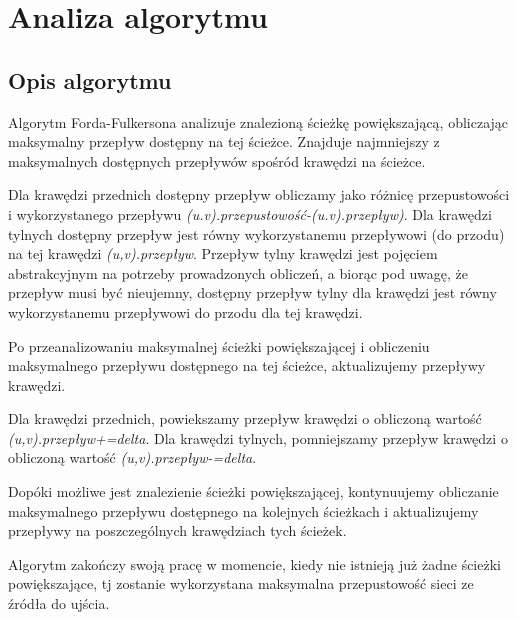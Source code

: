 \documentclass[10pt]{dokument-tiwo}
\begin{document}
\MakeDokumentMeta


\section{Analiza algorytmu}

\subsection{Opis algorytmu}
Algorytm Forda-Fulkersona analizuje znalezioną ścieżkę powiększającą, obliczając
maksymalny przepływ dostępny na tej ścieżce. Znajduje najmniejszy z maksymalnych
dostępnych przepływów spośród krawędzi na ścieżce.

Dla krawędzi przednich dostępny przepływ obliczamy jako różnicę przepustowości i
wykorzystanego przepływu \emph{(u.v).przepustowość-(u.v).przepływ)}. Dla
krawędzi tylnych dostępny przepływ jest równy wykorzystanemu przepływowi (do
przodu) na tej krawędzi \emph{(u,v).przepływ}. Przepływ tylny krawędzi jest
pojęciem abstrakcyjnym na potrzeby prowadzonych obliczeń, a biorąc pod uwagę, że
przepływ musi być nieujemny, dostępny przepływ tylny dla krawędzi jest równy
wykorzystanemu przepływowi do przodu dla tej krawędzi.

Po przeanalizowaniu maksymalnej ścieżki powiększającej i obliczeniu maksymalnego
przepływu dostępnego na tej ścieżce, aktualizujemy przepływy krawędzi.

Dla krawędzi przednich, powiekszamy przepływ krawędzi o obliczoną wartość
\emph{(u,v).przepływ+=delta}. Dla krawędzi tylnych, pomniejszamy przepływ
krawędzi o obliczoną wartość \emph{(u,v).przepływ-=delta}.

Dopóki możliwe jest znalezienie ścieżki powiększającej, kontynuujemy obliczanie
maksymalnego przepływu dostępnego na kolejnych ścieżkach i aktualizujemy
przepływy na poszczególnych krawędziach tych ścieżek.

Algorytm zakończy swoją pracę w momencie, kiedy nie istnieją już żadne ścieżki
powiększające, tj zostanie wykorzystana maksymalna przepustowość sieci ze źródła
do ujścia.
\end{document}
